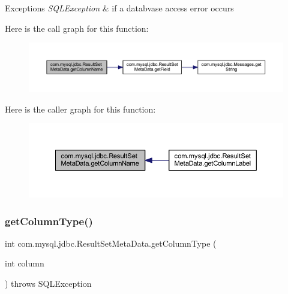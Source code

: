 \begin{DoxyExceptions}{Exceptions}
{\em S\+Q\+L\+Exception} & if a databvase access error occurs \\
\hline
\end{DoxyExceptions}
Here is the call graph for this function\+:
\nopagebreak
\begin{figure}[H]
\begin{center}
\leavevmode
\includegraphics[width=350pt]{classcom_1_1mysql_1_1jdbc_1_1_result_set_meta_data_a3d9e5968e455f0ab1e8ffc2263b19e0b_cgraph}
\end{center}
\end{figure}
Here is the caller graph for this function\+:
\nopagebreak
\begin{figure}[H]
\begin{center}
\leavevmode
\includegraphics[width=350pt]{classcom_1_1mysql_1_1jdbc_1_1_result_set_meta_data_a3d9e5968e455f0ab1e8ffc2263b19e0b_icgraph}
\end{center}
\end{figure}
\mbox{\label{classcom_1_1mysql_1_1jdbc_1_1_result_set_meta_data_a02c543ac124aef56d0266da247510a91}} 
\subsubsection{\texorpdfstring{get\+Column\+Type()}{getColumnType()}}
{\footnotesize\ttfamily int com.\+mysql.\+jdbc.\+Result\+Set\+Meta\+Data.\+get\+Column\+Type (\begin{DoxyParamCaption}\item[{int}]{column }\end{DoxyParamCaption}) throws S\+Q\+L\+Exception}

